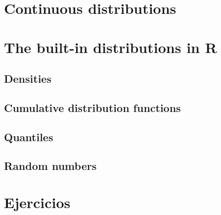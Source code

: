\section{Continuous distributions}
\section{The built-in distributions in R}
\subsection{Densities}
\subsection{Cumulative distribution functions}
\subsection{Quantiles}
\subsection{Random numbers}
\section{Ejercicios}



